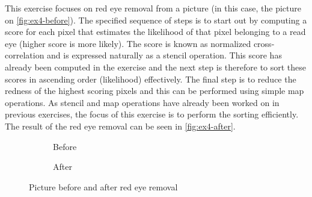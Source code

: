 This exercise focuses on red eye removal from a picture (in this case, the picture on \autoref{fig:ex4-before}).
The specified sequence of steps is to start out by computing a score for each pixel that estimates the likelihood of that pixel belonging to a read eye (higher score is more likely).
The score is known as normalized cross-correlation and is expressed naturally as a stencil operation.
This score has already been computed in the exercise and the next step is therefore to sort these scores in ascending order (likelihood) effectively.
The final step is to reduce the redness of the highest scoring pixels and this can be performed using simple map operations.
As stencil and map operations have already been worked on in previous exercises, the focus of this exercise is to perform the sorting efficiently.
The result of the red eye removal can be seen in \autoref{fig:ex4-after}.
\begin{figure}[ht]
	\centering
	\begin{subfigure}{.5\textwidth}
		\centering
		\caption{Before}
		\label{fig:ex4-before}
	\end{subfigure}%
	\begin{subfigure}{.5\textwidth}
		\centering
		\caption{After}
		\label{fig:ex4-after}
	\end{subfigure}
	\caption{Picture before and after red eye removal}
	\label{fig:ex4}
\end{figure}

